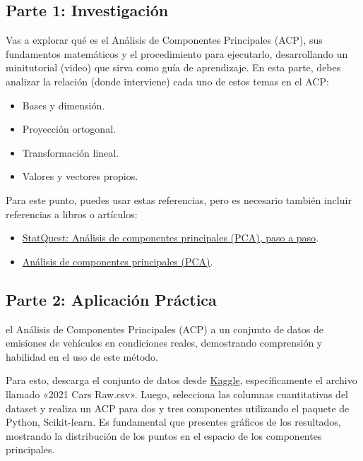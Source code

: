 \documentclass[a4,11pt]{aleph-notas}
\begin{document}
\subsection{Parte 1: Investigación}

Vas a explorar qué es el Análisis de Componentes Principales (ACP), sus fundamentos matemáticos y el procedimiento para ejecutarlo, desarrollando un minitutorial (video) que sirva como guía de aprendizaje. En esta parte, debes analizar la relación (donde interviene) cada uno de estos temas en el ACP:

\begin{itemize}
\item
    Bases y dimensión.
\item
    Proyección ortogonal.
\item
    Transformación lineal.
\item 
    Valores y vectores propios.
\end{itemize}

Para este punto, puedes usar estas referencias, pero es necesario también incluir referencias a libros o artículos: 
\begin{itemize}
    \item \href{https://youtu.be/FgakZw6K1QQ?si=a9cxs4ePio-H6MXm}{StatQuest: Análisis de componentes principales (PCA), paso a paso}.
    \item \href{https://youtu.be/7My_PBhxeP4?si=zQf5Hr18NOb6cerX}{Análisis de componentes principales (PCA)}.
\end{itemize}


\subsection{Parte 2: Aplicación Práctica}

el Análisis de Componentes Principales (ACP) a un conjunto de datos de emisiones de vehículos en condiciones reales, demostrando comprensión y habilidad en el uso de este método.

Para esto, descarga el conjunto de datos desde \href{https://www.kaggle.com/datasets/konradb/real-world-vehicle-emissions}{Kaggle}, específicamente el archivo llamado «2021 Cars Raw.csv». Luego, selecciona las columnas cuantitativas del dataset y realiza un ACP para dos y tres componentes utilizando el paquete de Python, Scikit-learn. Es fundamental que presentes gráficos de los resultados, mostrando la distribución de los puntos en el espacio de los componentes principales.
\end{document}
